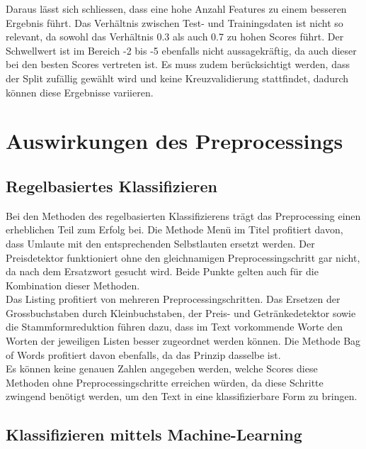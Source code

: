 Daraus lässt sich schliessen, dass eine hohe Anzahl Features zu einem besseren Ergebnis führt.
Das Verhältnis zwischen Test- und Trainingsdaten ist nicht so relevant, da sowohl das Verhältnis 0.3 als auch 0.7 zu hohen Scores führt.
Der Schwellwert ist im Bereich -2 bis -5 ebenfalls nicht aussagekräftig, da auch dieser bei den besten Scores vertreten ist.
Es muss zudem berücksichtigt werden, dass der Split zufällig gewählt wird und keine Kreuzvalidierung stattfindet, dadurch können diese Ergebnisse variieren.
\FloatBarrier
\section{Auswirkungen des Preprocessings}
\subsection{Regelbasiertes Klassifizieren}
Bei den Methoden des regelbasierten Klassifizierens trägt das Preprocessing einen erheblichen Teil zum Erfolg bei.
Die Methode \glqq Menü im Titel\grqq{} profitiert davon, dass Umlaute mit den entsprechenden Selbstlauten ersetzt werden.
Der Preisdetektor funktioniert ohne den gleichnamigen Preprocessingschritt gar nicht, da nach dem Ersatzwort gesucht wird.
Beide Punkte gelten auch für die Kombination dieser Methoden.\\
Das Listing profitiert von mehreren Preprocessingschritten.
Das Ersetzen der Grossbuchstaben durch Kleinbuchstaben, der Preis- und Getränkedetektor sowie die Stammformreduktion führen dazu, dass im Text vorkommende Worte den Worten der jeweiligen Listen besser zugeordnet werden können.
Die Methode \glqq Bag of Words\grqq{} profitiert davon ebenfalls, da das Prinzip dasselbe ist.\\
Es können keine genauen Zahlen angegeben werden, welche Scores diese Methoden ohne Preprocessingschritte erreichen würden, da diese Schritte zwingend benötigt werden, um den Text in eine klassifizierbare Form zu bringen.
\subsection{Klassifizieren mittels Machine-Learning}
